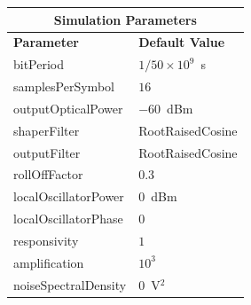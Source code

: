 \begin{refsection}
\begin{table}[H]
	\centering
	\footnotesize
	\begin{tabular}{|l|l|}
		\hline
		\multicolumn{2}{|c|}{ \textbf{Simulation Parameters} } \\
		\hline
		\textbf{Parameter}     & \textbf{Default Value}                                     \\\hline
		bitPeriod              & $1/50\times10^9$~s														\\\hline
		samplesPerSymbol       & $16$                                                       \\\hline
		outputOpticalPower     & $-60$~dBm 													\\ \hline
		shaperFilter	       & RootRaisedCosine												\\ \hline
		outputFilter		   & RootRaisedCosine												\\ \hline
		rollOffFactor		   & 0.3														\\ \hline
		localOscillatorPower   & $0$~dBm                                                    \\ \hline
		localOscillatorPhase   & $0$                                                        \\ \hline
		responsivity           & $1$                                                        \\ \hline
		amplification          & $10^3$                                                     \\ \hline
		noiseSpectralDensity   & $0$~V$^2$                             					\\ \hline

\end{tabular}
\end{table}
\end{refsection}
